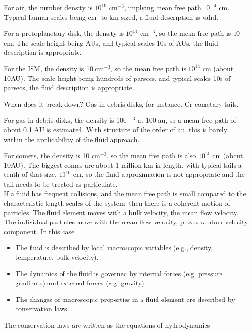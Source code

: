 For air, the number density is $10^{19}$ cm$^{-3}$, implying mean free path
$10^{-4}$ cm. Typical human scales being cm- to km-sized, a fluid
description is valid. 

For a protoplanetary disk, the density is $10^{14}$ cm$^{-3}$, so the mean
free path is $10$ cm. The scale height being AUs, and typical scales
10s of AUs, the fluid description is appropriate. 

For the ISM, the density is 10 cm$^{-3}$, so the mean
free path is $10^{14}$ cm (about 10AU). The scale height being
hundreds of parsecs, and typical scales 10s of parsecs, the fluid
description is appropriate.

When does it break down? Gas in debris disks, for instance. Or
cometary tails.

For gas in debris disks, the density is 100 $^{-3}$ at 100 au, so a
mean free path of about 0.1 AU is estimated. With structure of the
order of au, this is barely within the applicability of the fluid
approach.  

For comets, the density is 10 cm$^{-3}$, so the mean
free path is also $10^{14}$ cm (about 10AU). The biggest comas are about 1
million km in length, with typical tails a tenth of that size,
$10^{10}$ cm, so the fluid approximation is not appropriate and the
tail needs to be treated as particulate.\\ 

If a fluid has frequent collisions, and the mean free path
is small compared to the characteristic length scales of the system,
then there is a coherent motion of particles. The fluid element moves
with a bulk velocity, the mean flow velocity. The individual particles
move with the mean flow velocity, plus a random velocity component. In
this case 

\begin{itemize}
\item The fluid is described by local macroscopic variables (e.g., density,
temperature, bulk velocity).

\item The dynamics of the fluid is governed by internal forces
(e.g. pressure gradients) and external forces (e.g. gravity).

\item The changes of macroscopic properties in a fluid element are described
by conservation laws.
\end{itemize}

The conservation laws are written as the equations of hydrodynamics 


